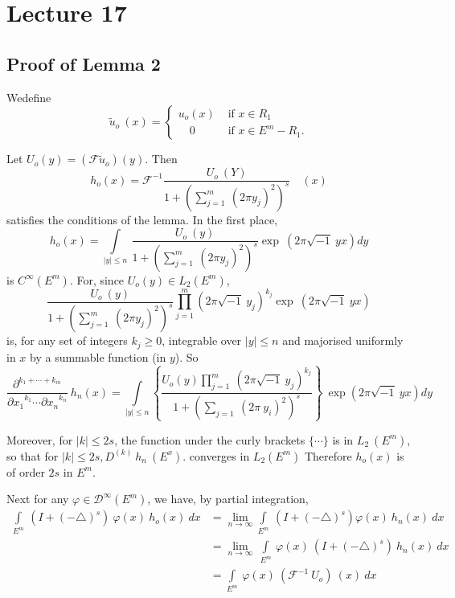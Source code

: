 \chapter{Lecture 17}\label{chap17} %

\section{Proof of Lemma 2}\label{chap17:sec1}

 We\pageoriginale define
 \begin{equation*}
  \tilde{u}_o ~ (x) =
  \begin{cases}
   u_o(x) &\text{ if } x \in R_1\\
   \quad 0 & \text{ if } x \in E^m - R_1.
  \end{cases}
 \end{equation*}

Let $U_o(y) = (\mathscr{F}\tilde{u}_o)(y)$. Then
$$
h_o(x) =\mathscr{F}^{-1} \frac{U_o ~ (Y)}{1+(\sum_{j=1}^m ~ (2 \pi y_j)^2)^s}
\quad (x) 
$$
satisfies the conditions of the lemma. In the first place,  
$$
h_o(x) = \int\limits_{|y|\le n} ~ \frac{U_o ~ (y)}{1+(\sum_{j=1}^m ~
 (2 \pi y_j)^2)^s} \exp ~ (2\pi\sqrt{-1} ~ yx)dy 
$$
is $C^\infty(E^m)$. For, since $U_o(y) \in L_2 (E^m)$, 
$$
\frac{U_o ~ (y)}{1+(\sum_{j=1}^m ~ (2 \pi y_j)^2)^s} \prod_{j=1}^{m}
(2\pi\sqrt{-1}~ y_j)^{k_j} \exp ~ (2\pi\sqrt{-1} ~ yx) 
$$
is, for any set of integers $k_j \ge 0$, integrable over $| y | \le n$
and majorised uniformly in $x$ by a summable function (in $y$). So 
{\fontsize{10pt}{12pt}\selectfont
$$
\frac{\partial^{k_1 + \cdots + k_m}}{{ \partial x_1}^{k_1} \cdots
 {\partial x_n}^{k_n}} ~ h_n(x) = \int\limits_{| y | \le n} \left\{
\frac{U_o(y)\prod\limits_{j=1}^{m} ~ (2\pi\sqrt{-1}~ y_j)^{k_j}}{1+
 (\sum_{j=1} ~ (2\pi ~y_i)^2)^s}\right\} ~ \exp (2\pi\sqrt{-1} ~
yx)dy 
$$}\relax

Moreover, for $| k | \le 2s$, the function under the curly brackets
$\{ \cdots \}$ is in $L_2 ~ (E^m)$, so that for $| k | \le 2s, D^{(k)}
~ h_n ~ (E^x)$. converges in $L_2(E^m)$ Therefore $h_o(x)$ is of order
$2s$ in $E^m$. 

Next for any $\varphi \in \mathscr{D}^\infty (E^m)$, we have, by
partial integration, 
\begin{align*}
\int\limits_{E^m} ~ (I + (-\triangle)^s) ~ \varphi(x) ~ h_o (x) ~ dx &
=\lim_{n \rightarrow \infty} \int\limits_{E^m} ~ (I + (-\triangle)^s)
\varphi(x) ~ h_n(x) ~ dx\\ 
 & = \lim_{n \rightarrow \infty} ~ \int\limits_{E^m} ~ \varphi(x) ~
 (I + (-\triangle)^s) ~ h_n (x) ~ dx\\ 
 & = \int\limits_{E^m} ~ \varphi (x) ~ (\mathscr{F}^{-1} ~ U_o) ~ (x) ~ dx
\end{align*}

